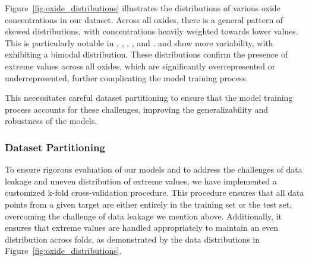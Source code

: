 Figure~\ref{fig:oxide_distributions} illustrates the distributions of various oxide concentrations in our dataset.
Across all oxides, there is a general pattern of skewed distributions, with concentrations heavily weighted towards lower values.
This is particularly notable in , , , , and .
 and  show more variability, with  exhibiting a bimodal distribution.
These distributions confirm the presence of extreme values across all oxides, which are significantly overrepresented or underrepresented, further complicating the model training process.

This necessitates careful dataset partitioning to ensure that the model training process accounts for these challenges, improving the generalizability and robustness of the models.


\subsubsection{Dataset Partitioning}\label{subsubsec:dataset_partitioning}
To ensure rigorous evaluation of our models and to address the challenges of data leakage and uneven distribution of extreme values, we have implemented a customized k-fold cross-validation procedure.
This procedure ensures that all data points from a given target are either entirely in the training set or the test set, overcoming the challenge of data leakage we mention above.
Additionally, it ensures that extreme values are handled appropriately to maintain an even distribution across folds, as demonstrated by the data distributions in Figure~\ref{fig:oxide_distributions}.

